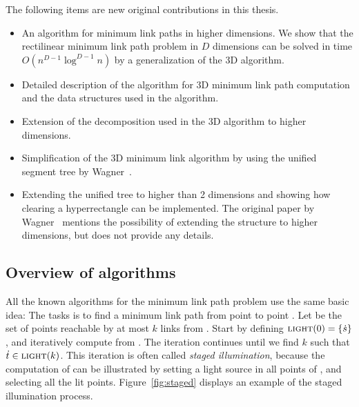 \documentclass[english,gradu]{tktltiki2018}
\begin{document}
The following items are new original contributions in this thesis.

\begin{itemize}
\item An algorithm for minimum link paths in higher dimensions. We show that the rectilinear minimum link path problem in $D$ dimensions can be solved in time $O(n^{D-1}\log^{D-1} n)$ by a generalization of the 3D algorithm.
\item Detailed description of the algorithm for 3D minimum link path computation and the data structures used in the algorithm.
\item Extension of the decomposition used in the 3D algorithm to higher dimensions.
\item Simplification of the 3D minimum link algorithm by using the unified segment tree by Wagner~\cite{unified}.
\item Extending the unified tree to higher than 2 dimensions and showing how clearing a hyperrectangle can be implemented. The original paper by Wagner~\cite{unified} mentions the possibility of extending the structure to higher dimensions, but does not provide any details.
\end{itemize}

\subsection{Overview of algorithms}\label{sec:overview}

All the known algorithms for the minimum link path problem use the same basic idea:
The tasks is to find a minimum link path from point \spt to point \ept.
Let  be the set of points reachable by at most $k$ links from \spt.
Start by defining $\textsc{light}(0)=\left\{\dot{s}\right\}$, and iteratively compute  from .
The iteration continues until we find $k$ such that $\dot{t}\in\textsc{light}(k)$.
This iteration is often called \emph{staged illumination}, because the computation of  can be illustrated by setting a light source in all points of , and selecting all the lit points.
Figure~\ref{fig:staged} displays an example of the staged illumination process.
\end{document}
